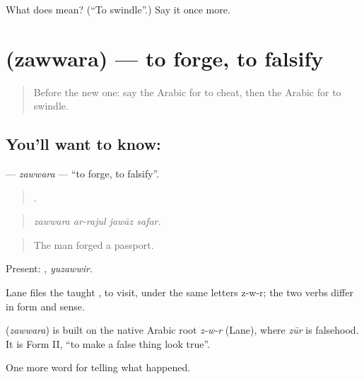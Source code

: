 \begin{tcolorbox}[breakable,colback=teal!4,colframe=teal!35!black,title={Before you move on}]
What does  mean? (\textquotedblleft{}To swindle\textquotedblright{}.) Say it once more.
\end{tcolorbox}
\section[\texorpdfstring{\ar{زور} (zawwara)}{زور (zawwara)}]{ (zawwara) — to forge, to falsify}

\label{lesson:AR-C351-zawwara}



\begin{quote}
Before the new one: say the Arabic for to cheat, then the Arabic for to swindle.
\end{quote}

\subsection*{You'll want to know: }
\textbf{} — \emph{zawwara} — \textquotedblleft{}to forge, to falsify\textquotedblright{}.

\begin{quote}
   .
\end{quote}

\begin{quote}
\emph{zawwara ar-rajul jawāz safar.}
\end{quote}

\begin{quote}
The man forged a passport.
\end{quote}

Present: , \emph{yuzawwir}.

Lane files the taught , to visit, under the same letters z-w-r; the two verbs differ in form and sense.

\begin{cousinweb}
\textbf{} (\emph{zawwara}) is built on the native Arabic root \emph{z-w-r} (Lane), where \emph{zūr} is falsehood. It is Form II, \textquotedblleft{}to make a false thing look true\textquotedblright{}.
\end{cousinweb}

\begin{grammarlens}[title={What you've built}]
One more word for telling what happened.
\end{grammarlens}

